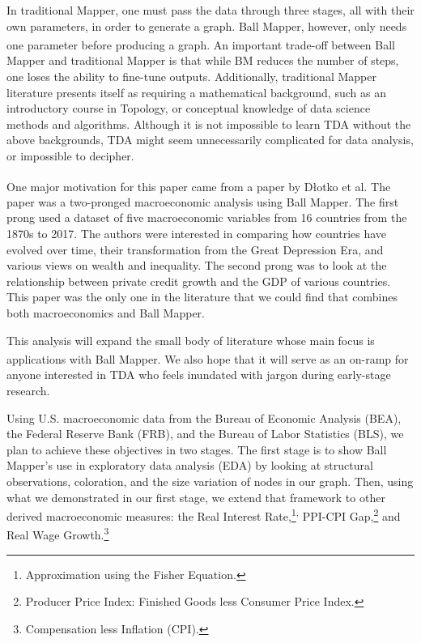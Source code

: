 \documentclass[10pt, letterpaper]{article}
\begin{document}
In traditional Mapper, one must pass the data through three stages, all
with their own parameters, in order to generate a graph. Ball Mapper,
however, only needs one parameter before producing a
graph.\textsuperscript{} An
important trade-off between Ball Mapper and traditional Mapper is that
while BM reduces the number of steps, one loses the ability to fine-tune
outputs. Additionally, traditional Mapper literature presents itself as
requiring a mathematical background, such as an introductory course in
Topology, or conceptual knowledge of data science methods and
algorithms. Although it is not impossible to learn TDA without the above
backgrounds, TDA might seem unnecessarily complicated for data analysis,
or impossible to decipher.

One major motivation for this paper came from a paper by D\l{}otko et
al.\textsuperscript{} The
paper was a two-pronged macroeconomic analysis using Ball Mapper. The
first prong used a dataset of five macroeconomic variables from 16
countries from the 1870s to 2017. The authors were interested in
comparing how countries have evolved over time, their transformation
from the Great Depression Era, and various views on wealth and
inequality. The second prong was to look at the relationship between
private credit growth and the GDP of various countries. This paper was
the only one in the literature that we could find that combines both
macroeconomics and Ball Mapper.

This analysis will expand the small body of literature whose main focus
is applications with Ball
Mapper.\textsuperscript{} We
also hope that it will serve as an on-ramp for anyone interested in TDA
who feels inundated with jargon during early-stage research.

Using U.S. macroeconomic data from the Bureau of Economic Analysis
(BEA), the Federal Reserve Bank (FRB), and the Bureau of Labor
Statistics (BLS), we plan to achieve these objectives in two stages. The
first stage is to show Ball Mapper's use in exploratory data analysis
(EDA) by looking at structural observations, coloration, and the size
variation of nodes in our graph. Then, using what we demonstrated in our
first stage, we extend that framework to other derived macroeconomic
measures: the Real Interest
Rate,\footnote{Approximation using the Fisher Equation.}\textsuperscript{,
} PPI-CPI
Gap,\footnote{Producer Price Index: Finished Goods less Consumer Price Index.}\textsuperscript{}
and Real Wage
Growth.\textsuperscript{}\footnote{Compensation less Inflation (CPI).}
\end{document}
